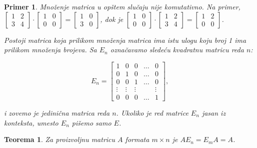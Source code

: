 \documentclass[11pt]{article}
\theoremstyle{masulthm}
\newtheorem{theorem}{Teorema}[section]
\theoremstyle{masuldef}
\theoremstyle{masulexmp}
\newtheorem*{exmp*}{Primer}
\theoremstyle{masulproof}
\begin{document}
\begin{exmp*}
    Množenje matrica u opštem slučaju nije komutativno. Na primer,
    $
    \begin{bmatrix}
        1 & 2 \\
        3 & 4
    \end{bmatrix}
    \cdot
    \begin{bmatrix}
        1 & 0 \\
        0 & 0
    \end{bmatrix}
    =
    \begin{bmatrix}
        1 & 0 \\
        3 & 0
    \end{bmatrix}
    $, dok je
    $
    \begin{bmatrix}
        1 & 0 \\
        0 & 0
    \end{bmatrix}
    \cdot
    \begin{bmatrix}
        1 & 2 \\
        3 & 4
    \end{bmatrix}
    =
    \begin{bmatrix}
        1 & 2 \\
        0 & 0
    \end{bmatrix}
    $.
    
    Postoji matrica koja prilikom množenja matrica ima istu ulogu koju broj 1 ima prilikom množenja brojeva.
    Sa $ E_n $ označavamo sledeću kvadratnu matricu reda $ n $:
    
    \begin{equation*}
        E_n =
        \begin{bmatrix}
            1 & 0 & 0 & \dots & 0 \\
            0 & 1 & 0 & \dots & 0 \\
            0 & 0 & 1 & \dots & 0 \\
            \vdots & \vdots & \vdots & & \vdots \\
            0 & 0 & 0 & \dots & 1
        \end{bmatrix},
    \end{equation*}
    
    i zovemo je \emph{jedinična matrica reda} $ n $.
    Ukoliko je red matrice $ E_n $ jasan iz konteksta, umesto $ E_n $ pišemo samo $ E $.
\end{exmp*}

\begin{theorem}
  Za proizvoljnu matricu $ A $ formata $ m \times n $ je $ AE_n = E_mA = A $.
\end{theorem}
\end{document}

